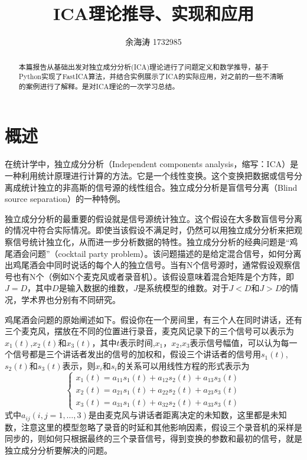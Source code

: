 \documentclass[UTF8,zihao=5]{ctexart}
\title{ICA理论推导、实现和应用}
\author{余海涛 1732985}
\date{}
\begin{document}
\maketitle

\begin{abstract}
    本篇报告从基础出发对独立成分分析(ICA)理论进行了问题定义和数学推导，基于Python实现了FastICA算法，并结合实例展示了ICA的实际应用，对之前的一些不清晰的案例进行了解释。是对ICA理论的一次学习总结。
\end{abstract}


\section{概述}
在统计学中，独立成分分析\cite{icawikipedia,ica,icachinese}（Independent components analysis，缩写：ICA）是一种利用统计原理进行计算的方法。它是一个线性变换。这个变换把数据或信号分离成统计独立的非高斯的信号源的线性组合。独立成分分析是盲信号分离（Blind source separation）的一种特例。

独立成分分析的最重要的假设就是信号源统计独立。这个假设在大多数盲信号分离的情况中符合实际情况。即使当该假设不满足时，仍然可以用独立成分分析来把观察信号统计独立化，从而进一步分析数据的特性。独立成分分析的经典问题是“鸡尾酒会问题”（cocktail party problem）。该问题描述的是给定混合信号，如何分离出鸡尾酒会中同时说话的每个人的独立信号。当有N个信号源时，通常假设观察信号也有N个（例如N个麦克风或者录音机）。该假设意味着混合矩阵是个方阵，即$J = D$，其中$D$是输入数据的维数，$J$是系统模型的维数。对于$J < D$和$J > D$的情况，学术界也分别有不同研究。

鸡尾酒会问题的原始阐述如下。假设你在一个房间里，有三个人在同时讲话，还有三个麦克风，摆放在不同的位置进行录音，麦克风记录下的三个信号可以表示为$x_1(t)$,$x_2(t)$和$x_3(t)$，其中$t$表示时间,$x_1$，$x_2$,$x_3$表示信号幅值，可以认为每一个信号都是三个讲话者发出的信号的加权和，假设三个讲话者的信号用$s_1(t)$,$s_2(t)$和$s_3(t)$表示，则$x_i$和$s_i$的关系可以用线性方程的形式表示为
\begin{equation}
    \left\{
        \begin{aligned}
            x_1(t)=a_{11}s_1(t)+a_{12}s_2(t)+a_{13}s_3(t) \\
            x_2(t)=a_{21}s_1(t)+a_{22}s_2(t)+a_{23}s_3(t) \\
            x_3(t)=a_{31}s_1(t)+a_{32}s_2(t)+a_{33}s_3(t)
        \end{aligned}
    \right.
\end{equation}
式中$a_{ij}(i,j=1,\ldots,3)$是由麦克风与讲话者距离决定的未知数，这里都是未知数，注意这里的模型忽略了录音的时延和其他影响因素，假设三个录音机的采样是同步的，则如何只根据最终的三个录音信号，得到变换的参数和最初的信号，就是独立成分分析要解决的问题。
\end{document}
